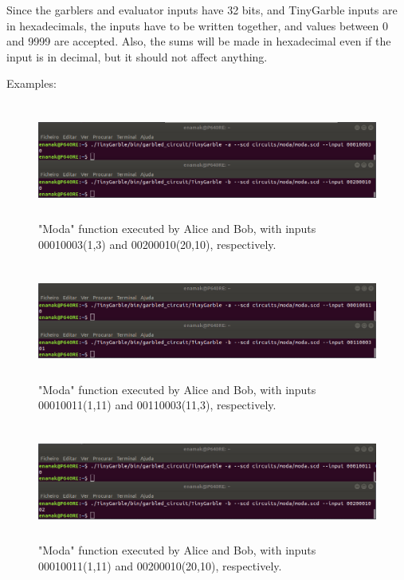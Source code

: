 \begin{refsection}
\newpage
Since the garblers and evaluator inputs have 32 bits, and TinyGarble inputs are in hexadecimals, the inputs have to be written together, and values between 0 and 9999 are accepted. Also, the sums will be made in hexadecimal even if the input is in decimal, but it should not affect anything.

Examples:

\begin{figure}[H]
	\centering
	\includegraphics[width=1\textwidth, height=3.8cm]{./sdf/tiny_garble/figures/tinygarble_moda_0.png}
    \caption{"Moda" function executed by Alice and Bob, with inputs 00010003(1,3) and 00200010(20,10), respectively.}\label{fig:tinygarble_moda_0}
\end{figure}

\begin{figure}[H]
	\centering
	\includegraphics[width=1\textwidth, height=3.8cm]{./sdf/tiny_garble/figures/tinygarble_moda_1.png}
    \caption{"Moda" function executed by Alice and Bob, with inputs 00010011(1,11) and 00110003(11,3), respectively.}\label{fig:tinygarble_moda_1}
\end{figure}

\begin{figure}[H]
	\centering
	\includegraphics[width=1\textwidth, height=3.8cm]{./sdf/tiny_garble/figures/tinygarble_moda_2.png}
    \caption{"Moda" function executed by Alice and Bob, with inputs 00010011(1,11) and 00200010(20,10), respectively.}\label{fig:tinygarble_moda_2}
\end{figure}


\end{refsection}
